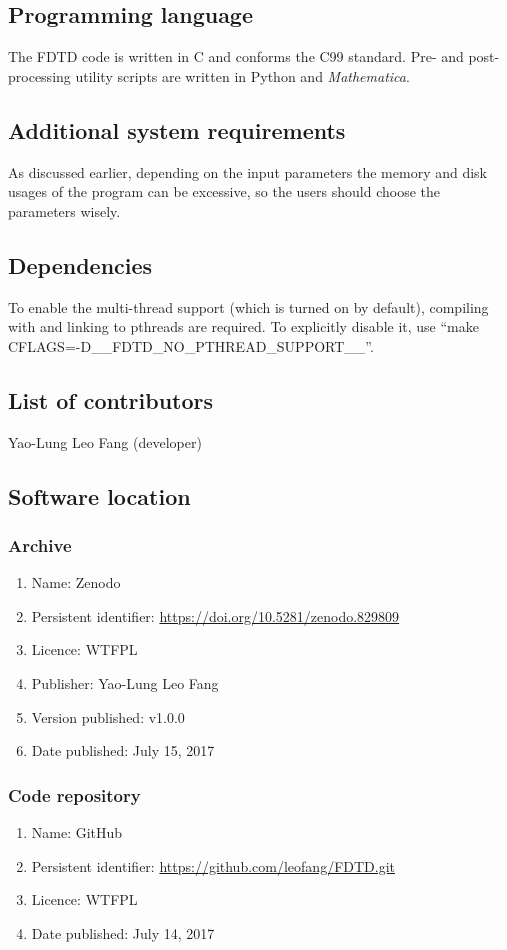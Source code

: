 \documentclass[12pt,letter,onecolumn,notitlepage]{article}
\begin{document}
\subsection{Programming language}
The FDTD code is written in C and conforms the C99 standard. Pre- and post-processing utility scripts are written in Python and \textit{Mathematica}.
 
\subsection{Additional system requirements}
As discussed earlier, depending on the input parameters the memory and disk usages of the program can be excessive, so the users should choose the parameters wisely.

\subsection{Dependencies}
To enable the multi-thread support (which is turned on by default), compiling with and linking to pthreads are required. To explicitly disable it, use ``make CFLAGS=-D\_\_FDTD\_NO\_PTHREAD\_SUPPORT\_\_''.

\subsection{List of contributors}
Yao-Lung Leo Fang (developer)

\subsection{Software location}
\subsubsection{Archive}
\begin{enumerate}
	\item Name: Zenodo
	\item Persistent identifier: \url{https://doi.org/10.5281/zenodo.829809}
	\item Licence: WTFPL
	\item Publisher: Yao-Lung Leo Fang
	\item Version published: v1.0.0
	\item Date published: July 15, 2017
\end{enumerate}

\subsubsection{Code repository}
\begin{enumerate}
	\item Name: GitHub
	\item Persistent identifier: \url{https://github.com/leofang/FDTD.git}
	\item Licence: WTFPL
	\item Date published: July 14, 2017
\end{enumerate}
\end{document}
